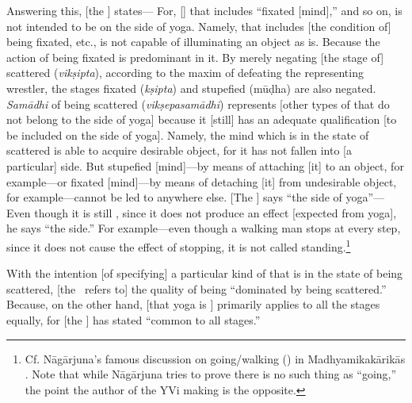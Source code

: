 Answering%
 this, [the \Bhasyakara]
states---
For, [\samadhi] that includes ``fixated [mind],'' and so on, is not intended to be on the side of yoga.  Namely, \samadhi\/ that includes [the condition of] being fixated, etc., is not capable of illuminating an object as is.  Because the action of being fixated is predominant in it.  By merely negating [the stage of] scattered (\emph{vikṣipta}), according to the maxim of defeating the representing
wrestler, the stages fixated (\emph{kṣipta}) and stupefied ({mūḍha}) are also negated.  \emph{Samādhi\/} of being scattered (\emph{vikṣepasamādhi}) represents [other types of \samadhi\/ that do not belong to the side of yoga] because it [still] has an adequate qualification [to be included on the side of
yoga].  Namely, the mind which is in the state of scattered is able
to acquire desirable object, for it has not fallen into [a
particular] side.  But stupefied [mind]---by means of attaching [it] to an object, for example---or fixated [mind]---by means of detaching [it] from undesirable object, for example---cannot be led to anywhere else.  [The \Bhasyakara] says ``the side of yoga''---Even though it is still
\samadhi, since it does not produce an effect [expected from yoga], he says ``the side.''  For example---even though a walking man stops at every step, since it
does not cause the effect of stopping, it is not called
standing.\footnote{Cf. {Nāgārjuna}\/'s famous discussion on going/walking (\gati)
  in {Madhyamikakārikā}s \citep[kk.~2.1--25]{mmk}.  Note that
  while {Nāgārjuna} tries to prove there is no such thing as
  ``going,'' the point the author of the YVi making is the
  opposite.}
  
With%
 the intention [of specifying] a particular kind of \samadhi\/ that is in the state of being scattered, [the \Bhasyakara\ refers to] the
quality of being ``dominated by being scattered.''  Because, on the other hand, [that yoga is \samadhi] primarily applies to all the stages equally, for [the \Bhasyakara] has stated ``common to all stages.''%

